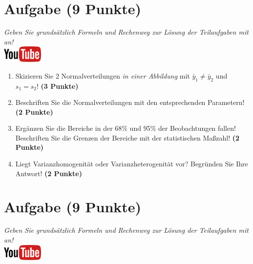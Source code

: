 \documentclass[a4paper, 9pt]{scrartcl}\usepackage[]{graphicx}\usepackage[]{xcolor}
\begin{document}
 
\clearpage

\section{Aufgabe \hfill (9 Punkte)}

\textit{Geben Sie grunds{\"a}tzlich Formeln und Rechenweg zur L{\"o}sung der
  Teilaufgaben mit an!} \\[1Ex]

\hfill\href{https://youtu.be/ZrJhn2wPbq4}{\includegraphics[width =
  2cm]{img/youtube}}\\[1Ex]



\begin{enumerate}
\item Skizieren Sie $2$ Normalverteilungen \textit{in einer
    Abbildung} mit $\bar{y}_1 \neq \bar{y}_2$ und $s_1 = s_2$! \textbf{(3 Punkte)}
\item Beschriften Sie die Normalverteilungen mit den entsprechenden
  Parametern! \textbf{(2 Punkte)}
\item Erg{\"a}nzen Sie die Bereiche in der 68\% und 95\% der Beobachtungen
  fallen! Beschriften Sie die Grenzen der Bereiche mit der statistischen Ma{\ss}zahl! \textbf{(2 Punkte)}
\item Liegt Varianzhomogenit{\"a}t oder Varianzheterogenit{\"a}t vor? Begr{\"u}nden Sie
  Ihre Antwort! \textbf{(2 Punkte)}
\end{enumerate}

 
\clearpage

\section{Aufgabe \hfill (9 Punkte)}

\textit{Geben Sie grunds{\"a}tzlich Formeln und Rechenweg zur L{\"o}sung der
  Teilaufgaben mit an!} \\[1Ex]

\hfill\href{https://youtu.be/MiD42k4l5Ag}{\includegraphics[width =
  2cm]{img/youtube}}\\[1Ex]
\end{document}
